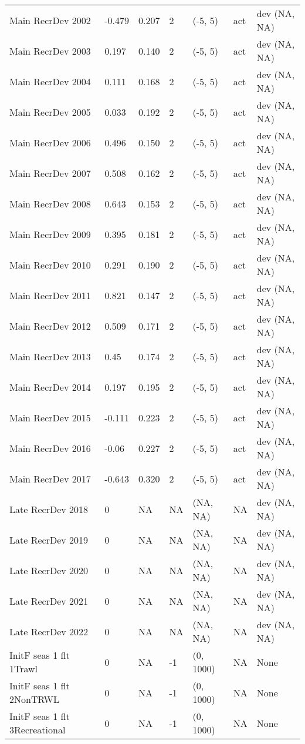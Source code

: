 \documentclass[11pt,
  english,
  letterpaper,
]{article}
\begin{document}
\begin{landscape}
\begin{longtable}[t]{>{\raggedright\arraybackslash}p{7.5cm}lllll>{\raggedright\arraybackslash}p{3.5cm}}
Main RecrDev 2002 & -0.479 & 0.207 & 2 & (-5, 5) & act & dev (NA, NA)\\
Main RecrDev 2003 & 0.197 & 0.140 & 2 & (-5, 5) & act & dev (NA, NA)\\
Main RecrDev 2004 & 0.111 & 0.168 & 2 & (-5, 5) & act & dev (NA, NA)\\
Main RecrDev 2005 & 0.033 & 0.192 & 2 & (-5, 5) & act & dev (NA, NA)\\
Main RecrDev 2006 & 0.496 & 0.150 & 2 & (-5, 5) & act & dev (NA, NA)\\
Main RecrDev 2007 & 0.508 & 0.162 & 2 & (-5, 5) & act & dev (NA, NA)\\
Main RecrDev 2008 & 0.643 & 0.153 & 2 & (-5, 5) & act & dev (NA, NA)\\
Main RecrDev 2009 & 0.395 & 0.181 & 2 & (-5, 5) & act & dev (NA, NA)\\
Main RecrDev 2010 & 0.291 & 0.190 & 2 & (-5, 5) & act & dev (NA, NA)\\
Main RecrDev 2011 & 0.821 & 0.147 & 2 & (-5, 5) & act & dev (NA, NA)\\
Main RecrDev 2012 & 0.509 & 0.171 & 2 & (-5, 5) & act & dev (NA, NA)\\
Main RecrDev 2013 & 0.45 & 0.174 & 2 & (-5, 5) & act & dev (NA, NA)\\
Main RecrDev 2014 & 0.197 & 0.195 & 2 & (-5, 5) & act & dev (NA, NA)\\
Main RecrDev 2015 & -0.111 & 0.223 & 2 & (-5, 5) & act & dev (NA, NA)\\
Main RecrDev 2016 & -0.06 & 0.227 & 2 & (-5, 5) & act & dev (NA, NA)\\
Main RecrDev 2017 & -0.643 & 0.320 & 2 & (-5, 5) & act & dev (NA, NA)\\
Late RecrDev 2018 & 0 & NA & NA & (NA, NA) & NA & dev (NA, NA)\\
Late RecrDev 2019 & 0 & NA & NA & (NA, NA) & NA & dev (NA, NA)\\
Late RecrDev 2020 & 0 & NA & NA & (NA, NA) & NA & dev (NA, NA)\\
Late RecrDev 2021 & 0 & NA & NA & (NA, NA) & NA & dev (NA, NA)\\
Late RecrDev 2022 & 0 & NA & NA & (NA, NA) & NA & dev (NA, NA)\\
InitF seas 1 flt 1Trawl & 0 & NA & -1 & (0, 1000) & NA & None\\
InitF seas 1 flt 2NonTRWL & 0 & NA & -1 & (0, 1000) & NA & None\\
InitF seas 1 flt 3Recreational & 0 & NA & -1 & (0, 1000) & NA & None\\

\end{longtable}
\end{landscape}
\end{document}
